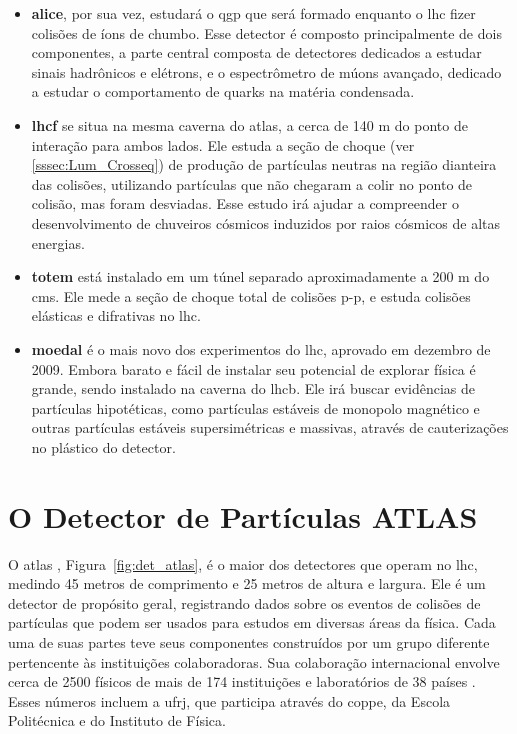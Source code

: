 \begin{itemize}
\item \textbf{\gls{alice}}, por sua vez, estudará o \gls{qgp} que será formado
enquanto o \gls{lhc} fizer colisões de íons de chumbo. Esse detector é composto
principalmente de dois componentes, a parte central composta de detectores dedicados
a estudar sinais hadrônicos e elétrons, e o espectrômetro de múons avançado,
dedicado a estudar o comportamento de quarks na matéria condensada.
\item \textbf{\gls{lhcf}} se situa na mesma caverna do \gls{atlas}, a cerca de
140 m do ponto de interação para ambos lados. Ele estuda a seção de choque (ver
\ref{sssec:Lum_Crosseq}) de produção de
partículas neutras na região dianteira das colisões, utilizando
partículas que não chegaram a colir no ponto de colisão, 
mas foram desviadas. Esse estudo irá ajudar a compreender o desenvolvimento de
chuveiros cósmicos induzidos por raios cósmicos de altas energias.
\item \textbf{\gls{totem}} está instalado em um túnel separado aproximadamente a
200 m do \gls{cms}. Ele mede a seção de choque total de colisões p-p, e estuda colisões 
elásticas e difrativas no \gls{lhc}. 
\item \textbf{\gls{moedal}} é o mais novo dos experimentos do \gls{lhc},
aprovado em dezembro de 2009. Embora barato e fácil de instalar seu potencial
de explorar física é grande, sendo instalado na caverna do \gls{lhcb}. 
Ele irá buscar evidências de partículas hipotéticas, como partículas estáveis de monopolo
magnético e outras partículas estáveis supersimétricas e massivas, através de
cauterizações no plástico do detector.
\end{itemize}

\section{O Detector de Partículas ATLAS}
\label{sec:ATLAS}

O \gls{atlas} \cite{ATLAS_TDR,ATLAS_TDR2,paper_atlas}, Figura~\ref{fig:det_atlas}, é o maior dos detectores que operam
no \gls{lhc}, medindo 45 metros de comprimento e 25 metros de altura e largura. 
Ele é um detector de propósito geral, registrando dados sobre os eventos de
colisões de partículas que podem ser usados para estudos em diversas áreas da
física. Cada uma de suas partes teve seus componentes 
construídos por um grupo diferente pertencente às instituições colaboradoras. 
Sua colaboração internacional envolve cerca de 2500 físicos de mais de 174 instituições 
e laboratórios de 38 países \cite{webATLAS}. 
Esses números incluem a \acrshort{ufrj}, que participa através do
\acrshort{coppe}, da Escola Politécnica e do Instituto de Física. 

